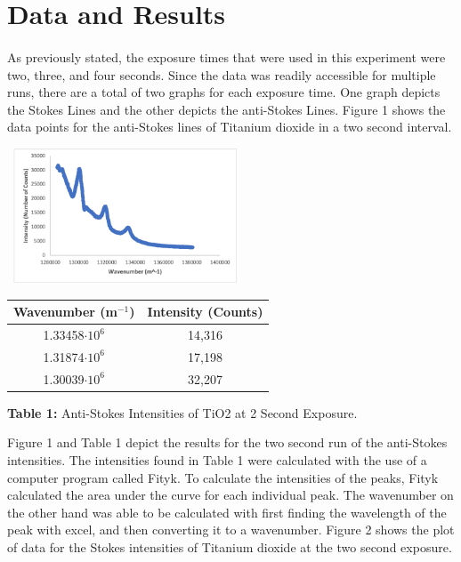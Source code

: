 \documentclass[12pt]{article}
\begin{document}
\section{Data and Results}
\begin{multicols}{2}
\paragraph{}
\setlength{\parskip}{1em}
As previously stated, the exposure times that were used in this experiment were two, three, and four seconds. Since the data was readily accessible for multiple runs, there are a total of two graphs for each exposure time. One graph depicts the Stokes Lines and the other depicts the anti-Stokes Lines. Figure 1 shows the data points for the anti-Stokes lines of Titanium dioxide in a two second interval.
\begin{center}
    \includegraphics[width=7cm, height=4cm]{PHYS 331 RS TiO2 Antistokes Wavnumber (2 Sec).png}
    \caption{\textbf{\small{Figure 1:}} \small{Anti-Stokes Intensities of TiO2 at 2 Second Exposure. The first peak that occurred which is around 1300000 $m^-1$ can be neglected due to errors in the instruments of the experiment.}}
\end{center}
\begin{tabular}{|c|c|}
    \hline \textbf{\small Wavenumber (m$^{-1}$)} & \textbf{\small Intensity (Counts)} \\ \hline
    1.33458$\cdot10^6$ & 14,316 \\ \hline
    1.31874$\cdot10^6$ & 17,198 \\ \hline
    1.30039$\cdot10^6$ & 32,207 \\ \hline
\end{tabular}
\centerline{\tiny{\textbf{Table 1:}} \tiny{Anti-Stokes Intensities of TiO2 at 2 Second Exposure.}}
\newline
Figure 1 and Table 1 depict the results for the two second run of the anti-Stokes intensities. The intensities found in Table 1 were calculated with the use of a computer program called Fityk. To calculate the intensities of the peaks, Fityk calculated the area under the curve for each individual peak. The wavenumber on the other hand was able to be calculated with first finding the wavelength of the peak with excel, and then converting it to a wavenumber. Figure 2 shows the plot of data for the Stokes intensities of Titanium dioxide at the two second exposure.

\end{multicols}
\end{document}
